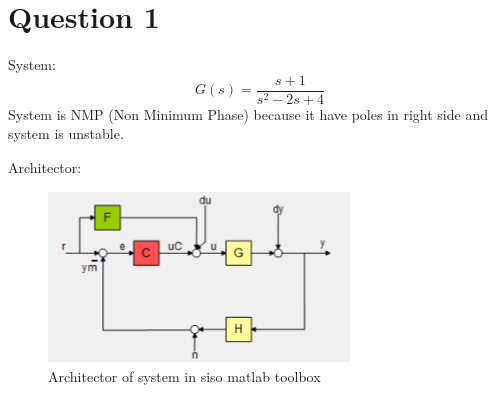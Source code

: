 \section{Question 1}
System:
$$
G(s) = \dfrac{s + 1}{s^2 -2s + 4}
$$
System is NMP (Non Minimum Phase) because it have poles in right side and system is unstable.


Architector:
\begin{figure}[H]
	\caption{Architector of system in siso matlab toolbox}
	\centering
	\includegraphics[width=8cm]{../Figure/Q1/Base/architector.png}
\end{figure}

